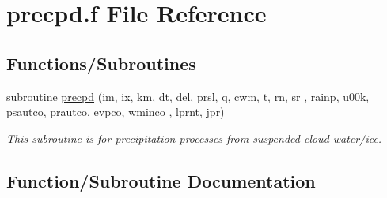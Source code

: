 \hypertarget{precpd_8f}{}\section{precpd.\+f File Reference}
\label{precpd_8f}
\subsection*{Functions/\+Subroutines}
\begin{DoxyCompactItemize}
\item 
subroutine \hyperlink{precpd_8f_ae4ad929ece53fb2262d73d3a614c0600}{precpd} (im, ix, km, dt, del, prsl, q, cwm, t, rn, sr                                           ,                                                                   rainp, u00k, psautco, prautco, evpco, wminco                       ,                                                                   lprnt, jpr)
\begin{DoxyCompactList}\small\item\em This subroutine is for precipitation processes from suspended cloud water/ice. \end{DoxyCompactList}\end{DoxyCompactItemize}


\subsection{Function/\+Subroutine Documentation}
